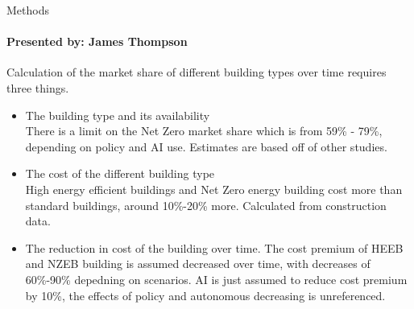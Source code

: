 \documentclass{beamer}
\begin{document}
\begin{frame}{Methods}
\framesubtitle{Presented by: James Thompson}

Calculation of the market share of different building types over time requires three things.
\begin{itemize}[<+->]
    \item The building type and its availability\\
    There is a limit on the Net Zero market share which is from 59\% - 79\%, depending on policy and AI use. Estimates are based off of other studies.
    \item The cost of the different building type\\
    High energy efficient buildings and Net Zero energy building cost more than standard buildings, around 10\%-20\% more. Calculated from construction data.
    \item The reduction in cost of the building over time.
    The cost premium of HEEB and NZEB building is assumed decreased over time, with decreases of 60\%-90\% depedning on scenarios. AI is just assumed to reduce cost premium by 10\%, the effects of policy and autonomous decreasing is unreferenced.
\end{itemize}
    
\end{frame}
\end{document}

